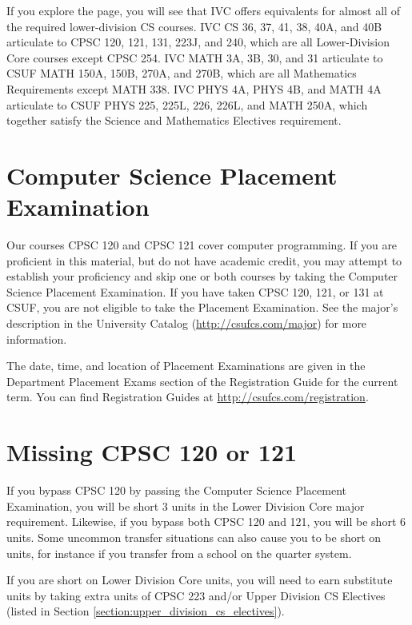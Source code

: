 \documentclass{book}
\newcommand{\CampusName}{CSUF}
\newcommand{\shrunkurl}[1]{\url{http://csufcs.com/#1}}
\begin{document}

If you explore the page, you will see that IVC offers equivalents for almost all of the required lower-division CS courses. IVC CS 36, 37, 41, 38, 40A, and 40B articulate to CPSC 120, 121, 131, 223J, and 240, which are all Lower-Division Core courses except CPSC 254. IVC MATH 3A, 3B, 30, and 31 articulate to CSUF MATH 150A, 150B, 270A, and 270B, which are all Mathematics Requirements except MATH 338. IVC PHYS 4A, PHYS 4B, and MATH 4A articulate to CSUF PHYS 225, 225L, 226, 226L, and MATH 250A, which together satisfy the Science and Mathematics Electives requirement.

\section{Computer Science Placement Examination}
\label{section:placement}
 Our courses CPSC 120 and CPSC 121 cover
computer programming. If you are proficient in this material, but do
not have academic credit, you may attempt to establish your
proficiency and skip one or both courses by taking the Computer
Science Placement Examination. If you have taken CPSC 120, 121, or 131
at \CampusName, you are not eligible to take the Placement
Examination. See the major's description in the University Catalog
(\shrunkurl{major}) for more information.

The date, time, and location of Placement Examinations are given in the Department Placement Exams section of the Registration Guide for the current term. You can find Registration Guides at \shrunkurl{registration}.

\section{Missing CPSC 120 or 121}

If you bypass CPSC 120 by passing the Computer Science Placement Examination, you will be short 3 units in the Lower Division Core major requirement. Likewise, if you bypass both CPSC 120 and 121, you will be short 6 units. Some uncommon transfer situations can also cause you to be short on units, for instance if you transfer from a school on the quarter system.

If you are short on Lower Division Core units, you will need to earn substitute units by
taking extra units of CPSC 223 and/or Upper Division CS Electives (listed in Section
\ref{section:upper_division_cs_electives}).
\end{document}
